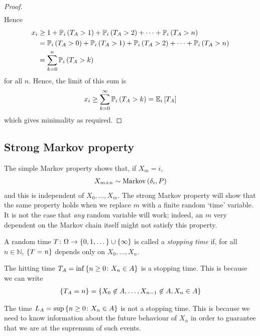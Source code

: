 \begin{proof}
\begin{align*}
	\end{align*}
	Hence
	\begin{align*}
		x_i & \geq 1 + \mathbb{P}_{i}\left({T_A > 1}\right) + \mathbb{P}_{i}\left({T_A > 2}\right) + \dots + \mathbb{P}_{i}\left({T_A > n}\right)              \\
		    & = \mathbb{P}_{i}\left({T_A > 0}\right) + \mathbb{P}_{i}\left({T_A > 1}\right) + \mathbb{P}_{i}\left({T_A > 2}\right) + \dots + \mathbb{P}_{i}\left({T_A > n}\right) \\
		    & = \sum_{k = 0}^n \mathbb{P}_{i}\left({T_A > k}\right)
	\end{align*}
	for all $n$.
	Hence, the limit of this sum is
	\begin{align*}
		x_i \geq \sum_{k=0}^\infty \mathbb{P}_{i}\left({T_A > k}\right) = \mathbb{E}_{i}\left[{T_A}\right]
	\end{align*}
	which gives minimality as required.
\end{proof}

\subsection{Strong Markov property}
The simple Markov property shows that, if $X_m = i$,
\begin{align*}
	X_{m + n} \sim \operatorname{Markov}\left({\delta_i, P}\right)
\end{align*}
and this is independent of $X_0, \dots, X_m$.
The strong Markov property will show that the same property holds when we replace $m$ with a finite random `time' variable.
It is not the case that \textit{any} random variable will work; indeed, an $m$ very dependent on the Markov chain itself might not satisfy this property.
\begin{definition}
	A random time $T \colon \Omega \to \qty{0, 1, \dots} \cup \qty{\infty}$ is called a \textit{stopping time} if, for all $n \in \mathbb N$, $\qty{ T = n }$ depends only on $X_0, \dots, X_n$.
\end{definition}
\begin{example}
	The hitting time $T_A = \inf \qty{ n \geq 0 \colon X_n \in A}$ is a stopping time.
	This is because we can write
	\begin{align*}
		\qty{T_A = n} = \qty{X_0 \not\in A, \dots, X_{n-1} \not\in A, X_n \in A}
	\end{align*}
\end{example}
\begin{example}
	The time $L_A = \sup \qty{n \geq 0 \colon X_n \in A}$ is not a stopping time.
	This is because we need to know information about the future behaviour of $X_n$ in order to guarantee that we are at the supremum of such events.
\end{example}
